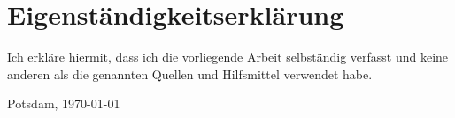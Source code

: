 
\chapter*{Eigenst\"andigkeitserkl\"arung}
Ich erkl\"are hiermit, dass ich die vorliegende Arbeit selbst\"andig verfasst und keine anderen als die genannten Quellen und Hilfsmittel verwendet habe.

\vspace{2cm}
Potsdam, \today

\vspace{1.5cm}
\AUTHOR
